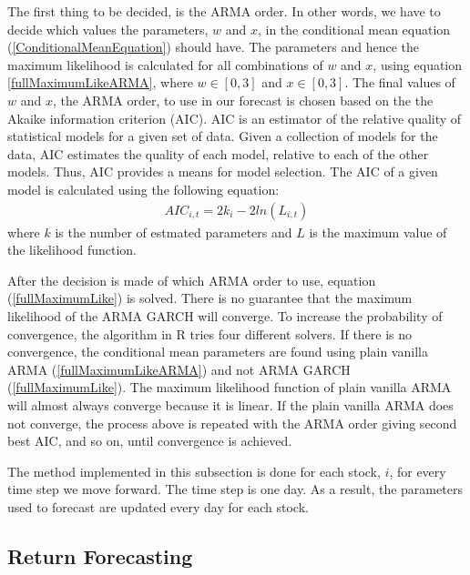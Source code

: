 The first thing to be decided, is the ARMA order. In other words, we have to decide which values the parameters, $w$ and $x$, in the conditional mean equation (\ref{ConditionalMeanEquation}) should have. The parameters and hence the maximum likelihood is calculated for all combinations of $w$ and $x$, using equation \ref{fullMaximumLikeARMA}, where $w\in[0,3]$ and $x\in[0,3]$. The final values of $w$ and $x$, the ARMA order, to use in our forecast is chosen based on the the Akaike information criterion (AIC). AIC is an estimator of the relative quality of statistical models for a given set of data. Given a collection of models for the data, AIC estimates the quality of each model, relative to each of the other models. Thus, AIC provides a means for model selection. The AIC of a given model is calculated using the following equation:
\begin{align}
    AIC_{i,t}=2k_i-2ln(L_{i,t})
\end{align}
where $k$ is the number of estmated parameters and $L$ is the maximum value of the likelihood function. 

After the decision is made of which ARMA order to use, equation (\ref{fullMaximumLike}) is solved. There is no guarantee that the maximum likelihood of the ARMA GARCH will converge. To increase the probability of convergence, the algorithm in R tries four different solvers. If there is no convergence, the conditional mean parameters are found using plain vanilla ARMA (\ref{fullMaximumLikeARMA}) and not ARMA GARCH (\ref{fullMaximumLike}). The maximum likelihood function of plain vanilla ARMA will almost always converge because it is linear. If the plain vanilla ARMA does not converge, the process above is repeated with the ARMA order giving second best AIC, and so on, until convergence is achieved.

The method implemented in this subsection is done for each stock, $i$, for every time step we move forward. The time step is one day. As a result, the parameters used to forecast are updated every day for each stock.


\subsection*{Return Forecasting}


